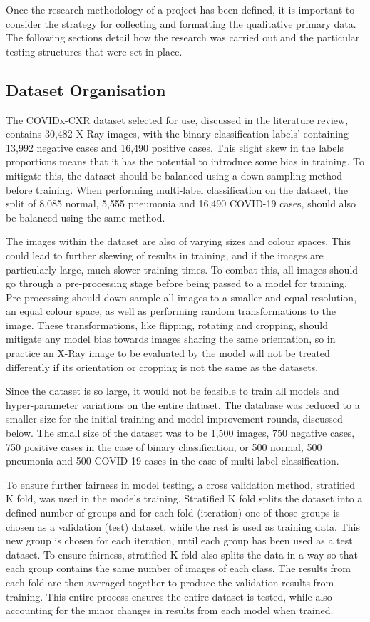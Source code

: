 Once the research methodology of a project has been defined, it is important to consider the strategy for collecting and formatting the qualitative primary data. The following sections detail how the research was carried out and the particular testing structures that were set in place.

\subsection{Dataset Organisation}
The COVIDx-CXR dataset selected for use, discussed in the literature review, contains 30,482 X-Ray images, with the binary classification labels' containing 13,992 negative cases and 16,490 positive cases. This slight skew in the labels proportions means that it has the potential to introduce some bias in training. To mitigate this, the dataset should be balanced using a down sampling method before training. When performing multi-label classification on the dataset, the split of 8,085 normal, 5,555 pneumonia and 16,490 COVID-19 cases, should also be balanced using the same method.

The images within the dataset are also of varying sizes and colour spaces. This could lead to further skewing of results in training, and if the images are particularly large, much slower training times. To combat this, all images should go through a pre-processing stage before being passed to a model for training. Pre-processing should down-sample all images to a smaller and equal resolution, an equal colour space, as well as performing random transformations to the image. These transformations, like flipping, rotating and cropping, should mitigate any model bias towards images sharing the same orientation, so in practice an X-Ray image to be evaluated by the model will not be treated differently if its orientation or cropping is not the same as the datasets.

Since the dataset is so large, it would not be feasible to train all models and hyper-parameter variations on the entire dataset. The database was reduced to a smaller size for the initial training and model improvement rounds, discussed below. The small size of the dataset was to be 1,500 images, 750 negative cases, 750 positive cases in the case of binary classification, or 500 normal, 500 pneumonia and 500 COVID-19 cases in the case of multi-label classification.

To ensure further fairness in model testing, a cross validation method, stratified K fold, was used in the models training. Stratified K fold splits the dataset into a defined number of groups and for each fold (iteration) one of those groups is chosen as a validation (test) dataset, while the rest is used as training data. This new group is chosen for each iteration, until each group has been used as a test dataset. To ensure fairness, stratified K fold also splits the data in a way so that each group contains the same number of images of each class. The results from each fold are then averaged together to produce the validation results from training. This entire process ensures the entire dataset is tested, while also accounting for the minor changes in results from each model when trained.

